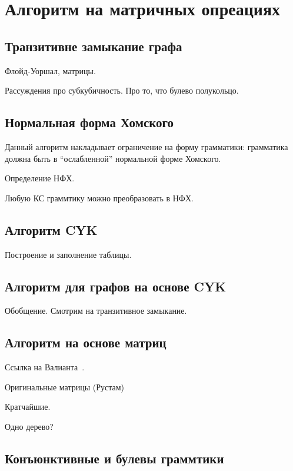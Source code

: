 \section{Алгоритм на матричных опреациях}


\subsection{Транзитивне замыкание графа}

Флойд-Уоршал, матрицы.

Рассуждения про субкубичность.
Про то, что булево полукольцо.

\subsection{Нормальная форма Хомского}

Данный алгоритм накладывает ограничение на форму грамматики: грамматика должна быть в ``ослабленной'' нормальной форме Хомского.

Определение НФХ.

Любую КС граммтику можно преобразовать в НФХ.

\subsection{Алгоритм CYK}

Построение и заполнение таблицы.

\subsection{Алгоритм для графов на основе CYK}

Обобщение. 
Смотрим на транзитивное замыкание.

\subsection{Алгоритм на основе матриц}

Ссылка на Валианта~\cite{!!!}.

Оригинальные матрицы (Рустам)~\cite{Azimov:2018:CPQ:3210259.3210264}

Кратчайшие.

Одно дерево?

\subsection{Конъюнктивные и булевы граммтики}


